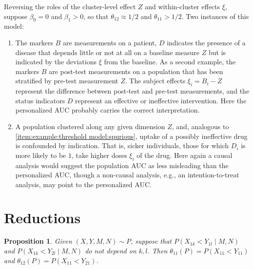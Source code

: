 \documentclass{beamer}
\renewcommand{\P}{P}
\newcommand{\cind}{\perp \!\!\! \perp}
\newcommand{\aucindiv}{\theta_{11}}%
\newcommand{\aucpop}{\theta_{12}}%
\newtheorem{proposition}[theorem]{Proposition}
\begin{document}
\begin{frame}
  Reversing the roles of the cluster-level effect $Z$ and within-cluster
  effects $\xi$, suppose $\beta_0=0$ and $\beta_1>0$, so that $\aucpop\approx 1/2$ and
  $\aucindiv>1/2$. Two instances of this model:
  \begin{enumerate}%
  \item  The markers $B$ are measurements on a patient, 
    $D$ indicates the presence of
    a disease that depends little or not at all on a baseline measure $Z$ but is indicated by the deviations $\xi$ from the
    baseline.  As a second example, the markers $B$ are post-test measurements on a population that has been stratified by pre-test measurement $Z$. The subject effects $\xi_i=B_i-Z$ represent the difference between post-test and pre-test measurements, and the status indicators $D$ represent an effective or ineffective intervention.
    Here the personalized AUC probably carries the correct interpretation.
  \end{enumerate}
\end{frame}

\begin{frame}
  \begin{enumerate}
    \setcounter{enumi}{1}
  \item A population clustered along any given dimension $Z$, and, analogous to \ref{item:example:threshold model:spurious}, uptake of a possibly ineffective drug is confounded by indication. That is, sicker individuals, those for which $D_i$ is more likely to be $1$, take higher doses $\xi_i$ of the drug. Here again a causal analysis would suggest the population AUC as less misleading than the personalized AUC, though a non-causal analysis, e.g., an intention-to-treat analysis, may point to the personalized AUC.
  \end{enumerate}
\end{frame}
    


\section{Reductions}
\begin{frame}
\begin{proposition}\label{proposition:reduction} Given
  $(X,Y,M,N)\sim \P$, suppose 
  that $\P(X_{1k}<Y_{1l}\mid M,N)$ and $\P(X_{1k}<Y_{2l}\mid M,N)$ do
  not depend on $k,l$. Then $\aucindiv(\P)=P(X_{11}<Y_{11})$
  and $\aucpop(\P)=P(X_{11}<Y_{21})$.
\end{proposition}
\end{frame}
\end{document}

